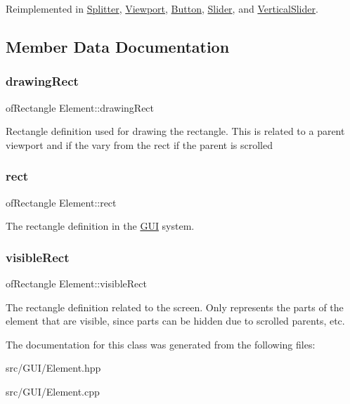 Reimplemented in \hyperlink{class_splitter_aab6c9e9479d8208e1959eb9fbfbcdfeb}{Splitter}, \hyperlink{class_viewport_a7997e0e684a4f8b5709f4d98be6cebb4}{Viewport}, \hyperlink{class_button_ad8e030c1c8846d43f3126047d4a3667f}{Button}, \hyperlink{class_slider_a8bcc94829fa9c1546097da4e797665cb}{Slider}, and \hyperlink{class_vertical_slider_ae868b87e37fbdac6e4906ac6b9ad465d}{Vertical\+Slider}.



\subsection{Member Data Documentation}
\mbox{\label{class_element_a497056184edcfc580df57aac565e94f8}} 
\subsubsection{\texorpdfstring{drawing\+Rect}{drawingRect}}
{\footnotesize\ttfamily of\+Rectangle Element\+::drawing\+Rect}

Rectangle definition used for drawing the rectangle. This is related to a parent viewport and if the vary from the {\ttfamily rect} if the parent is scrolled \mbox{\label{class_element_a8ec1c9655a75cf8791fd30ba7e995878}} 
\subsubsection{\texorpdfstring{rect}{rect}}
{\footnotesize\ttfamily of\+Rectangle Element\+::rect}

The rectangle definition in the \hyperlink{class_g_u_i}{G\+UI} system. \mbox{\label{class_element_affbc750717256c94422f99bbef8e39bf}} 
\subsubsection{\texorpdfstring{visible\+Rect}{visibleRect}}
{\footnotesize\ttfamily of\+Rectangle Element\+::visible\+Rect}

The rectangle definition related to the screen. Only represents the parts of the element that are visible, since parts can be hidden due to scrolled parents, etc. 

The documentation for this class was generated from the following files\+:\begin{DoxyCompactItemize}
\item 
src/\+G\+U\+I/Element.\+hpp\item 
src/\+G\+U\+I/Element.\+cpp\end{DoxyCompactItemize}
